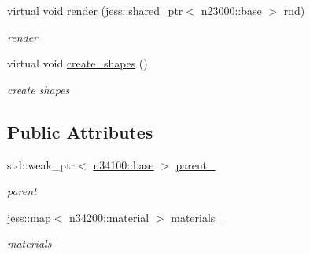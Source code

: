 \begin{DoxyCompactItemize}
virtual void \hyperlink{classnebula_1_1content_1_1actor_1_1physics_1_1base_ad03b69e3d7ea25e9a5e93cd8000b799b}{render} (jess::shared\_\-ptr$<$ \hyperlink{classnebula_1_1platform_1_1renderer_1_1base}{n23000::base} $>$ rnd)
\begin{DoxyCompactList}\small\item\em render \item\end{DoxyCompactList}\item 
virtual void \hyperlink{classnebula_1_1content_1_1actor_1_1physics_1_1base_acb8de05018a4ca6927706627d9f7c48c}{create\_\-shapes} ()
\begin{DoxyCompactList}\small\item\em create shapes \item\end{DoxyCompactList}\end{DoxyCompactItemize}
\subsection*{Public Attributes}
\begin{DoxyCompactItemize}
\item 
std::weak\_\-ptr$<$ \hyperlink{classnebula_1_1content_1_1actor_1_1admin_1_1base}{n34100::base} $>$ \hyperlink{classnebula_1_1content_1_1actor_1_1physics_1_1base_a225162a653eae9e2821d9c36de7f86a7}{parent\_\-}
\begin{DoxyCompactList}\small\item\em parent \item\end{DoxyCompactList}\item 
jess::map$<$ \hyperlink{classnebula_1_1content_1_1actor_1_1physics_1_1material}{n34200::material} $>$ \hyperlink{classnebula_1_1content_1_1actor_1_1physics_1_1base_a6ccde21685a79a1b9e699a2055b725f6}{materials\_\-}
\begin{DoxyCompactList}\small\item\em materials \item\end{DoxyCompactList}\end{DoxyCompactItemize}
